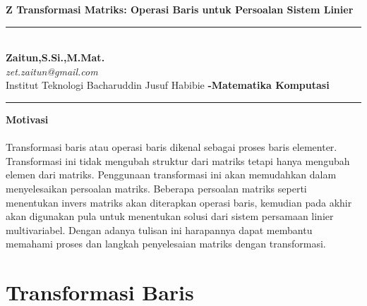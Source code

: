 \documentclass{article}   %
\begin{document}
	
	\begin{center}
		\vspace{.4cm}
		\textsf{\textbf { \large Z Transformasi Matriks: Operasi Baris untuk Persoalan Sistem Linier \@Judul }}
	\end{center}
\vspace{.4cm}
	\hrule
	\textsf{\\
	\textbf{Zaitun,S.Si.,M.Mat.} \hspace{\fill}
	\textit{\large }\\ [0.7ex]
	\textit{zet.zaitun@gmail.com} \hspace{\fill} \textbf{}\\ [0.7ex]
	Institut Teknologi Bacharuddin Jusuf Habibie \hspace{\fill} \textbf{-Matematika Komputasi}} \\
		\hrule
		
		
		\vspace{.4cm}
		\begin{center}
			\textbf{\Large Motivasi}
		\end{center}
\paragraph*{} 
Transformasi baris atau operasi baris dikenal sebagai proses baris elementer. Transformasi ini tidak mengubah struktur dari matriks tetapi hanya mengubah elemen dari matriks. Penggunaan transformasi ini akan memudahkan dalam menyelesaikan persoalan matriks. Beberapa persoalan matriks seperti menentukan invers matriks akan diterapkan operasi baris, kemudian pada akhir akan digunakan pula untuk menentukan solusi dari sistem persamaan linier multivariabel. Dengan adanya tulisan ini harapannya dapat membantu memahami proses dan langkah penyelesaian matriks dengan transformasi.
		\section{Transformasi Baris}
\end{document}
